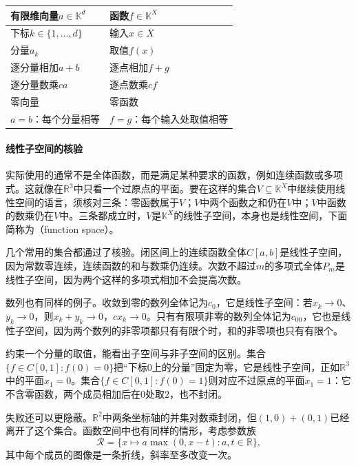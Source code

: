\begin{BookInlineTable}
  \centering
  \begin{tabular}{@{}ll@{}}
    \toprule
    有限维向量$a\in\mathbb K^d$ & 函数$f\in\mathbb K^X$\\
    \midrule
    下标$k\in\{1,\ldots,d\}$ & 输入$x\in X$\\
    分量$a_k$ & 取值$f(x)$\\
    逐分量相加$a+b$ & 逐点相加$f+g$\\
    逐分量数乘$ca$ & 逐点数乘$cf$\\
    零向量 & 零函数\\
    $a=b$：每个分量相等 & $f=g$：每个输入处取值相等\\
    \bottomrule
  \end{tabular}
  \caption{有限维向量与函数的对应。左右两列的运算规则相同，差别只在下标集合。}
  \label{tab:fvec-dictionary}
\end{BookInlineTable}

\paragraph{线性子空间的核验}
实际使用的通常不是全体函数，而是满足某种要求的函数，例如连续函数或多项式。这就像在$\mathbb R^3$中只看一个过原点的平面。要在这样的集合$V\subseteq\mathbb K^X$中继续使用线性空间的语言，须核对三条：零函数属于$V$；$V$中两个函数之和仍在$V$中；$V$中函数的数乘仍在$V$中。三条都成立时，$V$是$\mathbb K^X$的线性子空间，本身也是线性空间，下面简称为（function space）。

几个常用的集合都通过了核验。闭区间上的连续函数全体$C[a,b]$是线性子空间，因为常数零连续，连续函数的和与数乘仍连续。次数不超过$m$的多项式全体$P_m$是线性子空间，因为两个这样的多项式相加不会提高次数。

数列也有同样的例子。收敛到零的数列全体记为$c_0$，它是线性子空间：若$x_k\to0$、$y_k\to0$，则$x_k+y_k\to0$，$cx_k\to0$。只有有限项非零的数列全体记为$c_{00}$，它也是线性子空间，因为两个数列的非零项都只有有限个时，和的非零项也只有有限个。

约束一个分量的取值，能看出子空间与非子空间的区别。集合$\{f\in C[0,1]:f(0)=0\}$把“下标$0$上的分量”固定为零，它是线性子空间，正如$\mathbb R^3$中的平面$x_1=0$。集合$\{f\in C[0,1]:f(0)=1\}$则对应不过原点的平面$x_1=1$：它不含零函数，两个成员相加后在$0$处取$2$，也不封闭。

失败还可以更隐蔽。$\mathbb R^2$中两条坐标轴的并集对数乘封闭，但$(1,0)+(0,1)$已经离开了这个集合。函数空间中也有同样的情形，考虑参数族
\[
 \mathcal R=\{x\mapsto a\max(0,x-t):a,t\in\mathbb R\},
\]
其中每个成员的图像是一条折线，斜率至多改变一次。

